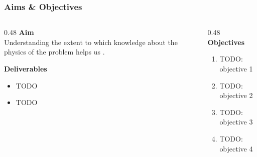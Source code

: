 
\begin{frame}
	\frametitle{Aims \& Objectives}

	\begin{columns}[T]
		\begin{column}{0.48\linewidth}
			\textbf{Aim}\\
			Understanding the extent to which knowledge about the physics of the problem helps us .


            

            

			\textbf{Deliverables}
			\begin{itemize}
				\item TODO
				\item TODO
			\end{itemize}
		\end{column}
		\begin{column}{0.48\linewidth}
			\textbf{Objectives}
			\begin{enumerate}
				\item TODO: objective 1
				\item TODO: objective 2
				\item TODO: objective 3
				\item TODO: objective 4
			\end{enumerate}
		\end{column}
	\end{columns}
\end{frame}
